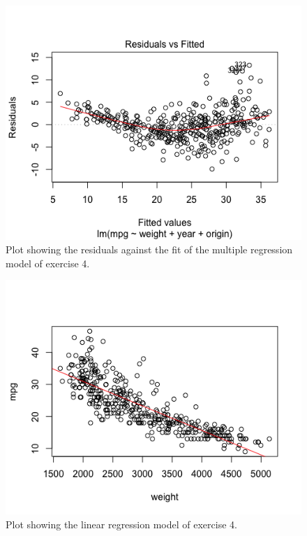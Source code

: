 \documentclass{paper}
\begin{document}
\begin{figure}
  \begin{center}
    \quad\quad
    \includegraphics[width=.8\linewidth]{res4}
  \end{center}
  \caption{Plot showing the residuals against the fit of the multiple regression
   model of exercise 4.}
   \label{fig:res4}
\end{figure}

\begin{figure}
  \begin{center}
    \quad\quad
    \includegraphics[width=.8\linewidth]{ex4}
  \end{center}
  \caption{Plot showing the linear regression
   model of exercise 4.}
   \label{fig:ex4}
\end{figure}
\end{document}
